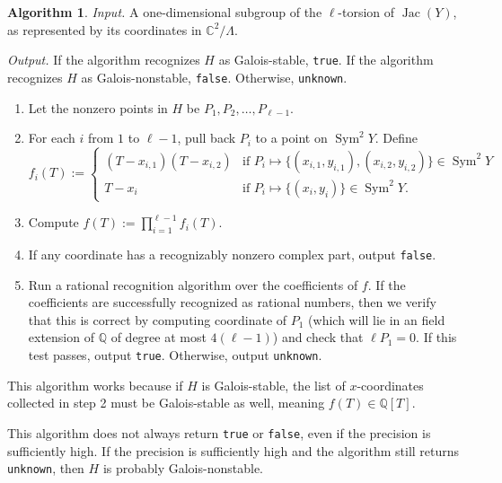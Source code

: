 \documentclass{amsproc}
\numberwithin{equation}{section}
\theoremstyle{definition}
\newtheorem{algorithm}[equation]{Algorithm}
\theoremstyle{remark}
\DeclareMathOperator{\Jac}{Jac}
\DeclareMathOperator{\Sym}{Sym}
\newcommand{\QQ}{\mathbb Q}
\begin{document}
\begin{algorithm}
\label{alg:calculate_H}
\emph{Input.} A one-dimensional subgroup of the $\ell$-torsion of $\Jac(Y)$, as represented by its coordinates in $\mathbb{C}^2/\Lambda$. 

\emph{Output.} If the algorithm recognizes $H$ as Galois-stable, \texttt{true}. If the algorithm recognizes $H$ as Galois-nonstable, \texttt{false}. Otherwise, \texttt{unknown}.
\begin{enumerate}
\item Let the nonzero points in $H$ be $P_1, P_2, \ldots, P_{\ell - 1}$.
\item For each $i$ from $1$ to $\ell - 1$, pull back $P_i$ to a point on $\Sym^2 Y$. Define
\begin{equation}
    f_i(T) := \begin{cases}
        (T-x_{i,1})(T-x_{i,2}) & \text{if } P_i\mapsto \{(x_{i,1}, y_{i,1}), (x_{i,2}, y_{i,2})\} \in \Sym^2 Y \\
        T-x_i & \text{if } P_i\mapsto \{(x_i, y_i)\} \in \Sym^2 Y.
    \end{cases}
\end{equation}
\item Compute $f(T) := \prod_{i = 1}^{\ell - 1}f_i(T)$.
\item If any coordinate has a recognizably nonzero complex part, output \texttt{false}.
\item Run a rational recognition algorithm over the coefficients of $f$. If the coefficients are successfully recognized as rational numbers, then we verify that this is correct by computing coordinate of $P_1$ (which will lie in an field extension of $\QQ$ of degree at most $4(\ell-1)$)
and check that $\ell P_1=0$.
If this test passes, output \texttt{true}.
Otherwise, output \texttt{unknown}.
\end{enumerate}

\end{algorithm}

This algorithm works because if $H$ is Galois-stable, the list of $x$-coordinates collected in step 2 must be Galois-stable as well, meaning $f(T) \in \QQ[T]$.

This algorithm does not always return \texttt{true} or \texttt{false}, even if the precision is sufficiently high. 
If the precision is sufficiently high and 
the algorithm still returns \texttt{unknown},
then $H$ is probably Galois-nonstable.
\end{document}
